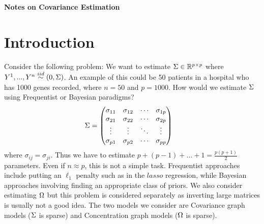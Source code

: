 \documentclass[12pt, leqno]{article}
\def\rpp{\ensuremath \mathbb{R}^{p \times p}}
\def\s{\ensuremath\Sigma}
\def\om{\ensuremath\Omega}
\def\stackrel#1#2{\mathrel{\mathop{#2}\limits^{#1}}}
\begin{document}
\begin{center}
{\large {\bf Notes on Covariance Estimation}} \\
\end{center}

\tableofcontents

\section{Introduction} Consider the following problem: We want to
estimate $\s \in \rpp$ where $ {Y}^1, ... ,
 {Y}^n \stackrel{iid}{\sim} ( {0}, \s)$. An example of this
could be 50 patients in a hospital who has 1000 genes recorded, where $n =50$ and $p = 1000$. How would we estimate $\s$
using Frequentist or Bayesian paradigms?
\begin{align*}
\s &=  \begin{pmatrix}
\sigma_{11}&\sigma_{12}&\cdots&\sigma_{1p}\\ 
\sigma_{21}&\sigma_{22}&\cdots&\sigma_{2p}\\ 
\vdots&\vdots&\ddots&\vdots\\
\sigma_{p1}&\sigma_{p2}&\cdots&\sigma_{pp}\\ 
\end{pmatrix}
\end{align*}
where $\sigma_{ij} = \sigma_{ji}$. Thus we have to estimate $p+(p-1)+
\dots + 1 = \frac{p(p+1)}{2}$ parameters. Even if $n \approx p$, this
is not a simple task.
Frequentist approaches include putting an $\ell_1$ penalty such
as 
in the $lasso$ regression, while Bayesian approaches involving finding
an appropriate class of priors. We also consider estimating $\om$ but
this problem is considered separately as inverting large matrices is
usually not a good idea. The two models we consider are
Covariance graph models ($\s$ is sparse) and
Concentration graph models ($\om$ is sparse).
\end{document}
